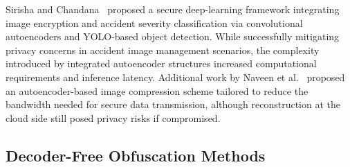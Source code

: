 \documentclass{ieeeaccess}
\begin{document}
Sirisha and Chandana~\cite{s23010519} proposed a secure deep-learning framework integrating image encryption and accident severity classification via convolutional autoencoders and YOLO-based object detection. While successfully mitigating privacy concerns in accident image management scenarios, the complexity introduced by integrated autoencoder structures increased computational requirements and inference latency. Additional work by Naveen et al.~\cite{10781629} proposed an autoencoder-based image compression scheme tailored to reduce the bandwidth needed for secure data transmission, although reconstruction at the cloud side still posed privacy risks if compromised.

\subsection{Decoder-Free Obfuscation Methods}




\end{document}
